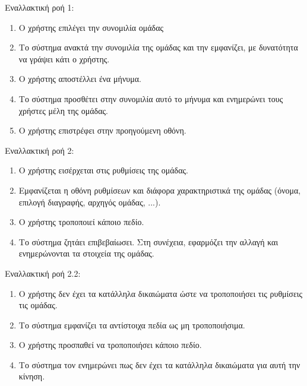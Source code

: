 Εναλλακτική ροή 1:
\begin{enumerate}[label=3.\alph*.,ref=3.\alph*]
\item Ο χρήστης επιλέγει την συνομιλία ομάδας
\item Το σύστημα ανακτά την συνομιλία της ομάδας και την εμφανίζει, με δυνατότητα να γράψει κάτι ο χρήστης.
\item Ο χρήστης αποστέλλει ένα μήνυμα.
\item Το σύστημα προσθέτει στην συνομιλία αυτό το μήνυμα και ενημερώνει τους χρήστες μέλη της ομάδας.
\item Ο χρήστης επιστρέφει στην προηγούμενη οθόνη.
\end{enumerate}

Εναλλακτική ροή 2:
\begin{enumerate}[label=3.\alph*.,ref=3.\alph*]
\item Ο χρήστης εισέρχεται στις ρυθμίσεις της ομάδας.
\item Εμφανίζεται η οθόνη ρυθμίσεων και διάφορα χαρακτηριστικά της ομάδας (όνομα, επιλογή διαγραφής, αρχηγός ομάδας, ...).
\item Ο χρήστης τροποποιεί κάποιο πεδίο.
\item Το σύστημα ζητάει επιβεβαίωσει. Στη συνέχεια, εφαρμόζει την αλλαγή και ενημερώνονται τα στοιχεία της ομάδας.
\end{enumerate}

Εναλλακτική ροή 2.2:
\begin{enumerate}[label=3.3.\alph*.,ref=3.3.\alph*]
\item Ο χρήστης δεν έχει τα κατάλληλα δικαιώματα ώστε να τροποποιήσει τις ρυθμίσεις τις ομάδας.
\item Το σύστημα εμφανίζει τα αντίστοιχα πεδία ως μη τροποποιήσιμα.
\item Ο χρήστης προσπαθεί να τροποποιήσει κάποιο πεδίο.
\item Το σύστημα τον ενημερώνει πως δεν έχει τα κατάλληλα δικαιώματα για αυτή την κίνηση.
\end{enumerate}




\newpage

